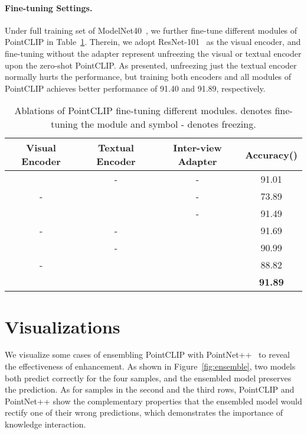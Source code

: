 \documentclass[10pt,twocolumn,letterpaper]{article}
\begin{document}
\paragraph{Fine-tuning Settings.}
Under full training set of ModelNet40~\cite{wu20153d}, we further fine-tune different modules of PointCLIP in Table~\ref{fine-tune}. Therein, we adopt ResNet-101~\cite{he2016deep} as the visual encoder, and fine-tuning without the adapter represent unfreezing the visual or textual encoder upon the zero-shot PointCLIP. As presented, unfreezing just the textual encoder normally hurts the performance, but training both encoders and all modules of PointCLIP achieves better performance of 91.40 and 91.89, respectively.
\begin{table}[ht]
\centering
\begin{adjustbox}{width=\linewidth}
	\begin{tabular}{cccc}
	\toprule
		 Visual Encoder & Textual Encoder 
		 & Inter-view Adapter  & Accuracy()\\ \midrule
		\Checkmark&- &- &91.01 \\
		- &\Checkmark &- &73.89 \\
		\Checkmark & \Checkmark & - & 91.49 \\
		- & - & \Checkmark & 91.69 \\
		\Checkmark & - & \Checkmark & 90.99 \\
		- & \Checkmark & \Checkmark & 88.82 \\
		\Checkmark & \Checkmark & \Checkmark & \textbf{91.89} \\
	\bottomrule
	\end{tabular}
\end{adjustbox}
\caption{Ablations of PointCLIP fine-tuning different modules. \Checkmark denotes fine-tuning the module and symbol - denotes freezing.}
\vspace{-0.5cm}
\label{fine-tune}
\end{table}
\section{Visualizations}
We visualize some cases of ensembling PointCLIP with PointNet++~\cite{qi2017pointnet++} to reveal the effectiveness of enhancement. As shown in Figure~\ref{fig:ensemble}, two models both predict correctly for the four samples, and the ensembled model preserves the prediction. As for samples in the second and the third rows, PointCLIP and PointNet++ show the complementary properties that the ensembled model would rectify one of their wrong predictions, which demonstrates the importance of knowledge interaction. 
\end{document}
